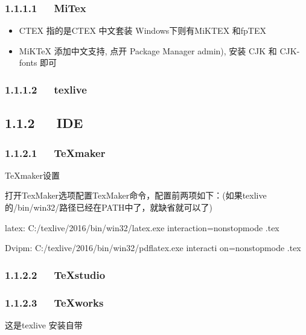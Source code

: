 \documentclass[letterpaper,12pt,english]{sphinxmanual}
\begin{document}
\subsubsection{1.1.1.1   MiTex}
\label{\detokenize{001software/001install/LaTex:mitex}}\begin{itemize}
\item {} 
CTEX 指的是CTEX 中文套装
Windows下则有MiKTEX 和fpTEX

\item {} 
MiKTeX
添加中文支持, 点开 Package Manager admin), 安装 CJK 和 CJK-fonts 即可

\end{itemize}


\subsubsection{1.1.1.2   texlive}
\label{\detokenize{001software/001install/LaTex:texlive}}

\subsection{1.1.2   IDE}
\label{\detokenize{001software/001install/LaTex:ide}}

\subsubsection{1.1.2.1   TeXmaker}
\label{\detokenize{001software/001install/LaTex:texmaker}}
\begin{sphinxVerbatim}[commandchars=\\\{\}]
TeXmaker设置

打开TexMaker\PYGZhy{}\PYGZgt{}选项\PYGZhy{}\PYGZgt{}配置TexMaker\PYGZhy{}\PYGZgt{}命令，配置前两项如下：(如果texlive的/bin/win32/路径已经在PATH中了，就缺省就可以了)

latex: \PYGZdq{}C:/texlive/2016/bin/win32/latex.exe\PYGZdq{} \PYGZhy{}interaction=nonstopmode \PYGZpc{}.tex

Dvipm: \PYGZdq{}C:/texlive/2016/bin/win32/pdflatex.exe\PYGZdq{} \PYGZhy{}interacti on=nonstopmode \PYGZpc{}.tex
\end{sphinxVerbatim}


\subsubsection{1.1.2.2   TeXstudio}
\label{\detokenize{001software/001install/LaTex:texstudio}}

\subsubsection{1.1.2.3   TeXworks}
\label{\detokenize{001software/001install/LaTex:texworks}}
这是texlive 安装自带
\end{document}
